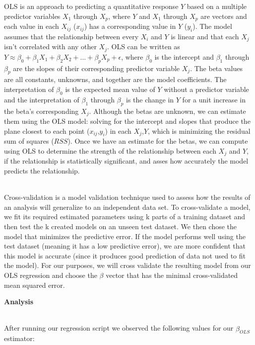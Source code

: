 \documentclass[11pt,english]{article}
\begin{document}
OLS is an approach to predicting a quantitative response $Y$ based on a multiple predictor variables $X_1$ through $X_p$, where $Y$ and $X_1$ through $X_p$ are vectors and each value in each $X_{ij}$ ($x_{ij}$) has a corresponding value in $Y$ ($y_i$). The model assumes that the relationship between every $X_i$ and $Y$ is linear and that each $X_j$ isn't correlated with any other $X_j$. OLS can be written as $Y \approx \beta_0 + \beta_1X_1 + \beta_2X_2 + ... + \beta_pX_p + \epsilon$, where $\beta_0$ is the intercept and $\beta_1$ through $\beta_p$ are the slopes of their corresponding predictor variable $X_j$. The beta values are all constants, unknowns, and together are the model coefficients. The interpretation of $\beta_0$ is the expected mean value of $Y$ without a predictor variable and the interpretation of $\beta_1$ through $\beta_p$ is the change in $Y$ for a unit increase in the beta's corresponding $X_j$. Although the betas are unknown, we can estimate them using the OLS model: solving for the intercept and slopes that produce the plane closest to each point ($x_{ij}$,$y_i$) in each $X_j$,$Y$, which is minimizing the residual sum of squares ($RSS$). Once we have an estimate for the betas, we can compute using OLS to determine the strength of the relationship between each $X_j$ and $Y$, if the relationship is statistically significant, and asses how accurately the model predicts the relationship. \\\

Cross-validation is a model validation technique used to assess how the results of an analysis will generalize to an independent data set. To cross-validate a model, we fit its required estimated parameters using k parts of a training dataset and then test the k created models on an unseen test dataset. We then chose the model that minimizes the predictive error. If the model performs well using the test dataset (meaning it has a low predictive error), we are more confident that this model is accurate (since it produces good prediction of data not used to fit the model). For our purposes, we will cross validate the resulting model from our OLS regression and choose the $\beta$ vector that has the minimal cross-validated mean squared error.
\vspace*{3\baselineskip}


{\large\textbf{Analysis}} \\\

After running our regression script we observed the following values for our $\hat{\beta}_{OLS}$ estimator:
\end{document}
